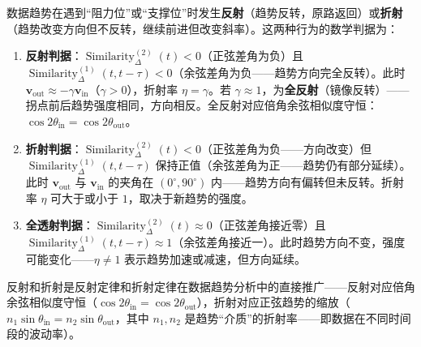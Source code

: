 \begin{definition}[趋势的反射与折射]\label{def:reflection_refraction_trend}
数据趋势在遇到“阻力位”或“支撑位”时发生\textbf{反射}（趋势反转，原路返回）或\textbf{折射}（趋势改变方向但不反转，继续前进但改变斜率）。这两种行为的数学判据为：
\begin{enumerate}[label=(\roman*)]
    \item \textbf{反射判据}：$\operatorname{Similarity}^{(2)}_{\Delta}(t) < 0$（正弦差角为负）且 $\operatorname{Similarity}^{(1)}_{\Delta}(t, t-\tau) < 0$（余弦差角为负——趋势方向完全反转）。此时 $\mathbf{v}_{\text{out}} \approx -\gamma \mathbf{v}_{\text{in}}$（$\gamma > 0$），折射率 $\eta = \gamma$。若 $\gamma \approx 1$，为\textbf{全反射}（镜像反转）——拐点前后趋势强度相同，方向相反。全反射对应倍角余弦相似度守恒：$\cos 2\theta_{\text{in}} = \cos 2\theta_{\text{out}}$。
    \item \textbf{折射判据}：$\operatorname{Similarity}^{(2)}_{\Delta}(t) < 0$（正弦差角为负——方向改变）但 $\operatorname{Similarity}^{(1)}_{\Delta}(t, t-\tau)$ 保持正值（余弦差角为正——趋势仍有部分延续）。此时 $\mathbf{v}_{\text{out}}$ 与 $\mathbf{v}_{\text{in}}$ 的夹角在 $(0^\circ, 90^\circ)$ 内——趋势方向有偏转但未反转。折射率 $\eta$ 可大于或小于 $1$，取决于新趋势的强度。
    \item \textbf{全透射判据}：$\operatorname{Similarity}^{(2)}_{\Delta}(t) \approx 0$（正弦差角接近零）且 $\operatorname{Similarity}^{(1)}_{\Delta}(t, t-\tau) \approx 1$（余弦差角接近一）。此时趋势方向不变，强度可能变化——$\eta \neq 1$ 表示趋势加速或减速，但方向延续。
\end{enumerate}
反射和折射是反射定律和折射定律在数据趋势分析中的直接推广——反射对应倍角余弦相似度守恒（$\cos 2\theta_{\text{in}} = \cos 2\theta_{\text{out}}$），折射对应正弦趋势的缩放（$n_1 \sin\theta_{\text{in}} = n_2 \sin\theta_{\text{out}}$，其中 $n_1, n_2$ 是趋势“介质”的折射率——即数据在不同时间段的波动率）。
\end{definition}

